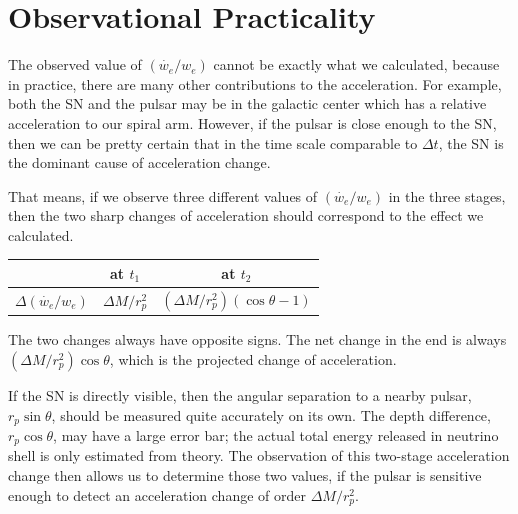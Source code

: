\documentclass[aps,showpacs,twocolumn,floats,prd,superscriptaddress,nofootinbib]{revtex4}
\begin{document}
\section{Observational Practicality}
\label{sec-obs}

The observed value of $(\dot{w_e}/w_e)$ cannot be exactly what we calculated, because in practice, there are many other contributions to the acceleration. For example, both the SN and the pulsar may be in the galactic center which has a relative acceleration to our spiral arm. However, if the pulsar is close enough to the SN, then we can be pretty certain that in the time scale comparable to $\Delta t$, the SN is the dominant cause of acceleration change. %

That means, if we observe three different values of $(\dot{w_e}/w_e)$ in the three stages, then the two sharp changes of acceleration should correspond to the effect we calculated.
\begin{center}
\begin{tabular}{| c | c | c |} 
\hline
                & at $t_1$ & at $t_2$ \\ 
       \hline 
$\Delta(\dot{w_e}/w_e)$ & $ \Delta M/r_p^2$ 
& $(\Delta M/r_p^2)(\cos\theta-1)$   \\ 
\hline 
\end{tabular}
\end{center}
The two changes always have opposite signs. The net change in the end is always $(\Delta M/r_p^2)\cos\theta$, which is the projected change of acceleration. 

If the SN is directly visible, then the angular separation to a nearby pulsar, $r_p\sin\theta$, should be measured quite accurately on its own. The depth difference, $r_p\cos\theta$, may have a large error bar; the actual total energy released in neutrino shell is only estimated from theory. The observation of this two-stage acceleration change then allows us to determine those two values, if the pulsar is sensitive enough to detect an acceleration change of order $\Delta M/r_p^2$.
\end{document}
